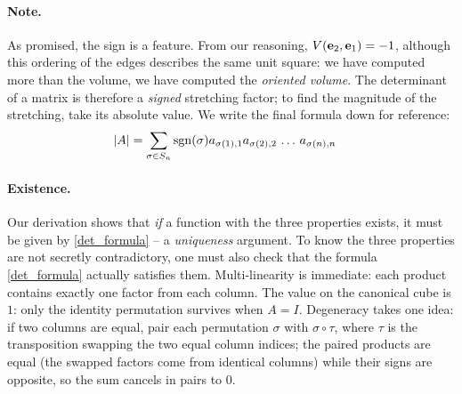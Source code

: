 \documentclass{article}
\begin{document}
\paragraph{Note.} As promised, the sign is a feature. From our reasoning,
$V({\bf e}_2, {\bf e}_1) = -1$, although this ordering of the edges describes
the same unit square: we have computed more than the volume, we have computed
the {\em oriented volume\/}. The determinant of a matrix is therefore a
{\em signed\/} stretching factor; to find the magnitude of the stretching,
take its absolute value. We write the final formula down for reference:
\begin{align}
  |A| &= \sum_{\sigma \in S_n} {\rm sgn}(\sigma)
            a_{\sigma(1), 1} a_{\sigma(2),2} \, \ldots \, a_{\sigma(n), n} \label{det_formula}
\end{align}

\paragraph{Existence.} Our derivation shows that {\em if\/} a function with
the three properties exists, it must be given by \eqref{det_formula} -- a
{\em uniqueness\/} argument. To know the three properties are not secretly
contradictory, one must also check that the formula \eqref{det_formula}
actually satisfies them. Multi-linearity is immediate: each product contains
exactly one factor from each column. The value on the canonical cube is $1$:
only the identity permutation survives when $A = I$. Degeneracy takes one
idea: if two columns are equal, pair each permutation $\sigma$ with
$\sigma \circ \tau$, where $\tau$ is the transposition swapping the two equal
column indices; the paired products are equal (the swapped factors come from
identical columns) while their signs are opposite, so the sum cancels in
pairs to $0$.
\end{document}
